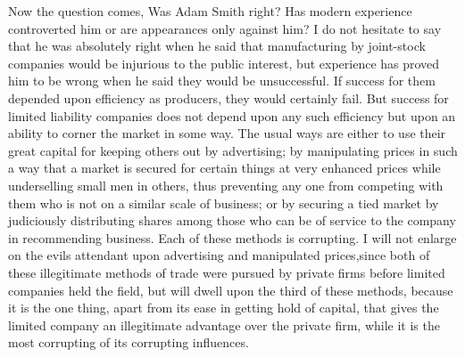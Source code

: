 \documentclass{book}
\begin{document}
Now the question comes, Was Adam Smith right? Has modern experience controverted him or are appearances only against him? I do not hesitate to say that he was absolutely right when he said that manufacturing by joint-stock companies would be injurious to the public interest, but experience has proved him to be wrong when he said they would be unsuccessful. If success for them depended upon efficiency as producers, they would certainly fail. But success for limited liability companies does not depend upon any such efficiency but upon an ability to corner the market in some way. The usual ways are either to use their great capital for keeping others out by advertising; by manipulating prices in such a way that a market is secured for certain things at very enhanced prices while underselling small men in others, thus preventing any one from competing with them who is not on a similar scale of business; or by securing a tied market by judiciously distributing shares among those who can be of service to the company in recommending business. Each of these methods is corrupting. I will not enlarge on the evils attendant upon advertising and manipulated prices,\footnotemark[2] since both of these illegitimate methods of trade were pursued by private firms before limited companies held the field, but will dwell upon the third of these methods, because it is the one thing, apart from its ease in getting hold of capital, that gives the limited company an illegitimate advantage over the private firm, while it is the most corrupting of its corrupting influences.
\end{document}
